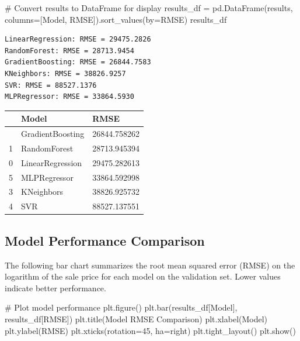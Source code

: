 \documentclass[
]{article}
\newenvironment{Shaded}{\begin{snugshade}}{\end{snugshade}}
\newcommand{\CommentTok}[1]{\textcolor[rgb]{0.37,0.37,0.37}{#1}}
\newcommand{\DecValTok}[1]{\textcolor[rgb]{0.68,0.00,0.00}{#1}}
\newcommand{\NormalTok}[1]{\textcolor[rgb]{0.00,0.23,0.31}{#1}}
\newcommand{\OperatorTok}[1]{\textcolor[rgb]{0.37,0.37,0.37}{#1}}
\newcommand{\StringTok}[1]{\textcolor[rgb]{0.13,0.47,0.30}{#1}}
\begin{document}
\begin{Shaded}
\begin{Highlighting}[]
\CommentTok{\# Convert results to DataFrame for display}
\NormalTok{results\_df }\OperatorTok{=}\NormalTok{ pd.DataFrame(results, columns}\OperatorTok{=}\NormalTok{[}\StringTok{\textquotesingle{}Model\textquotesingle{}}\NormalTok{, }\StringTok{\textquotesingle{}RMSE\textquotesingle{}}\NormalTok{]).sort\_values(by}\OperatorTok{=}\StringTok{\textquotesingle{}RMSE\textquotesingle{}}\NormalTok{)}
\NormalTok{results\_df}
\end{Highlighting}
\end{Shaded}

\begin{verbatim}
LinearRegression: RMSE = 29475.2826
RandomForest: RMSE = 28713.9454
GradientBoosting: RMSE = 26844.7583
KNeighbors: RMSE = 38826.9257
SVR: RMSE = 88527.1376
MLPRegressor: RMSE = 33864.5930
\end{verbatim}

\begin{longtable}[]{@{}lll@{}}
\toprule\noalign{}
& Model & RMSE \\
\midrule\noalign{}
\endhead
\bottomrule\noalign{}
\endlastfoot
2 & GradientBoosting & 26844.758262 \\
1 & RandomForest & 28713.945394 \\
0 & LinearRegression & 29475.282613 \\
5 & MLPRegressor & 33864.592998 \\
3 & KNeighbors & 38826.925732 \\
4 & SVR & 88527.137551 \\
\end{longtable}

\subsection{Model Performance
Comparison}\label{model-performance-comparison}

The following bar chart summarizes the root mean squared error (RMSE) on
the logarithm of the sale price for each model on the validation set.
Lower values indicate better performance.

\begin{Shaded}
\begin{Highlighting}[]
\CommentTok{\# Plot model performance}
\NormalTok{plt.figure()}
\NormalTok{plt.bar(results\_df[}\StringTok{\textquotesingle{}Model\textquotesingle{}}\NormalTok{], results\_df[}\StringTok{\textquotesingle{}RMSE\textquotesingle{}}\NormalTok{])}
\NormalTok{plt.title(}\StringTok{\textquotesingle{}Model RMSE Comparison\textquotesingle{}}\NormalTok{)}
\NormalTok{plt.xlabel(}\StringTok{\textquotesingle{}Model\textquotesingle{}}\NormalTok{)}
\NormalTok{plt.ylabel(}\StringTok{\textquotesingle{}RMSE\textquotesingle{}}\NormalTok{)}
\NormalTok{plt.xticks(rotation}\OperatorTok{=}\DecValTok{45}\NormalTok{, ha}\OperatorTok{=}\StringTok{\textquotesingle{}right\textquotesingle{}}\NormalTok{)}
\NormalTok{plt.tight\_layout()}
\NormalTok{plt.show()}
\end{Highlighting}
\end{Shaded}
\end{document}
